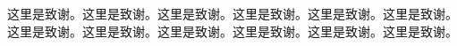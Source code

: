 \begin{acknowledge}
    这里是致谢。这里是致谢。这里是致谢。这里是致谢。这里是致谢。这里是致谢。这里是致谢。这里是致谢。这里是致谢。这里是致谢。这里是致谢。这里是致谢。
\end{acknowledge}